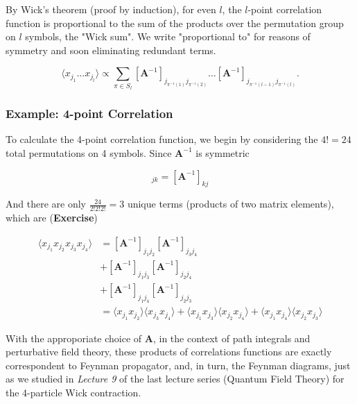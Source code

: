 \noindent By Wick's theorem (proof by induction), for even $l$, the $l$-point correlation function is proportional to the sum of the products over the permutation group on $l$ symbols, the "Wick sum". We write "proportional to" for reasons of symmetry and soon eliminating redundant terms.

\begin{equation}
\langle x_{j_1} \dots x_{j_l} \rangle \propto \sum_{\pi \in S_l} [\textbf{A}^{-1}]_{ j_{\pi^{-1}(1)}j_{\pi^{-1}(2)}} \dots [\textbf{A}^{-1}]_{j_{\pi^{-1}(l-1)}j_{\pi^{-1}(l)}} .
\end{equation}

\subsubsection*{Example: 4-point Correlation}

\noindent To calculate the 4-point correlation function, we begin by considering the $4!=24$ total permutations on 4 symbols. Since $\textbf{A}^{-1}$ is symmetric

\begin{equation}
[\textbf{A}^{-1}]_{jk} = [\textbf{A}^{-1}]_{kj} 
\end{equation}

\noindent And there are only $\frac{24}{2! 2! 2!} = 3$ unique terms (products of two matrix elements), which are (\textbf{Exercise})

\begin{align*}
\langle x_{j_1} x_{j_2} x_{j_3} x_{j_4} \rangle &= [\textbf{A}^{-1}]_{j_1 j_2} [\textbf{A}^{-1}]_{j_3 j_4} \\
&+ [\textbf{A}^{-1}]_{j_1 j_3} [\textbf{A}^{-1}]_{j_2 j_4} \\
&+ [\textbf{A}^{-1}]_{j_1 j_4} [\textbf{A}^{-1}]_{j_2 j_3} \\
&= \langle x_{j_1} x_{j_2} \rangle \langle x_{j_3} x_{j_4} \rangle + \langle x_{j_1} x_{j_3} \rangle \langle x_{j_2} x_{j_4} \rangle + \langle x_{j_1} x_{j_4} \rangle \langle x_{j_2} x_{j_3} \rangle
\end{align*}

\noindent With the approporiate choice of $\textbf{A}$, in the context of path integrals and perturbative field theory, these products of correlations functions are exactly correspondent to Feynman propagator, and, in turn, the Feynman diagrams, just as we studied in \textit{Lecture 9} of the last lecture series (Quantum Field Theory) for the 4-particle Wick contraction.


